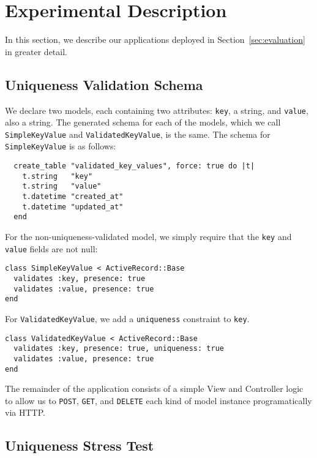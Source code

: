 \section{Experimental Description}
\label{sec:appendix-experiments}

\lstset{language=Ruby,basicstyle=\ttfamily\small,columns=fullflexible,frame=single}

In this section, we describe our applications deployed in Section~\ref{sec:evaluation} in greater detail.

\subsection{Uniqueness Validation Schema}
\label{sec:appendix-uniqueness-schema}

We declare two models, each containing two attributes: \texttt{key}, a string, and \texttt{value}, also a string. The generated schema for each of the models, which we call \texttt{SimpleKeyValue} and \texttt{ValidatedKeyValue}, is the same. The schema for \texttt{SimpleKeyValue} is as follows:

\begin{lstlisting}
  create_table "validated_key_values", force: true do |t|
    t.string   "key"
    t.string   "value"
    t.datetime "created_at"
    t.datetime "updated_at"
  end
\end{lstlisting}

For the non-uniqueness-validated model, we simply require that the \texttt{key} and \texttt{value} fields are not null:

\begin{lstlisting}
class SimpleKeyValue < ActiveRecord::Base
  validates :key, presence: true
  validates :value, presence: true
end
\end{lstlisting}

For \texttt{ValidatedKeyValue}, we add a \texttt{uniqueness} constraint to \texttt{key}.

\begin{lstlisting}
class ValidatedKeyValue < ActiveRecord::Base
  validates :key, presence: true, uniqueness: true
  validates :value, presence: true
end
\end{lstlisting}

The remainder of the application consists of a simple View and Controller logic to allow us to \texttt{POST}, \texttt{GET}, and \texttt{DELETE} each kind of model instance programatically via HTTP.


\subsection{Uniqueness Stress Test}
\label{sec:appendix-uniqueness-stress}

